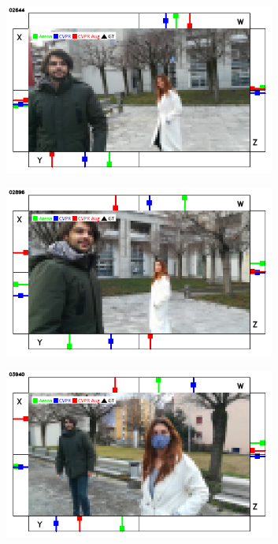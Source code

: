 \begin{figure}[H]
	\begin{center}
		\begin{subfigure}[h]{0.49\textwidth}
			\centering
			\includegraphics[width=0.98\textwidth]{"contents/images/qualitative-videos/double2-square02-2644"}
		\end{subfigure}
		\hfill
		\begin{subfigure}[h]{0.49\textwidth}
			\centering
			\includegraphics[width=0.98\textwidth]{"contents/images/qualitative-videos/double2-square02-2896"}
		\end{subfigure}
		\vfill
		\begin{subfigure}[h]{0.49\textwidth}
			\centering
			\includegraphics[width=0.98\textwidth]{"contents/images/qualitative-videos/double3-square02-3940"}

\end{subfigure}
\end{center}
\end{figure}
